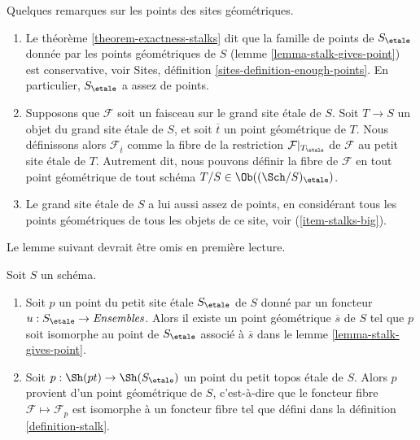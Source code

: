 \begin{remarks}
\label{remarks-enough-points}
Quelques remarques sur les points des sites g\'eom\'etriques.
\begin{enumerate}
\item Le th\'eor\`eme \ref{theorem-exactness-stalks} dit que la famille de points
de $S_\etale$ donn\'ee par les points g\'eom\'etriques de $S$
(lemme \ref{lemma-stalk-gives-point}) est conservative, voir
Sites, définition \ref{sites-definition-enough-points}.
En particulier, $S_\etale$ a assez de points.
\item Supposons que $\mathcal{F}$ soit un faisceau sur le grand site \'etale
\label{item-stalks-big}
de $S$. Soit $T \to S$ un objet du grand site \'etale de $S$,
et soit $\overline{t}$ un point g\'eom\'etrique de $T$. Nous d\'efinissons alors
$\mathcal{F}_{\overline{t}}$ comme la fibre
de la restriction $\mathcal{F}|_{T_\etale}$ de $\mathcal{F}$
au petit site \'etale de $T$. Autrement dit, nous pouvons d\'efinir
la fibre de $\mathcal{F}$ en tout point g\'eom\'etrique de tout
sch\'ema $T/S \in \Ob((\Sch/S)_\etale)$.
\item Le grand site \'etale de $S$ a lui aussi assez de points, en
consid\'erant tous les points g\'eom\'etriques de tous les objets de ce site, voir
(\ref{item-stalks-big}).
\end{enumerate}
\end{remarks}

\noindent
Le lemme suivant devrait \^etre omis en premi\`ere lecture.

\begin{lemma}
\label{lemma-points-small-etale-site}
Soit $S$ un sch\'ema.
\begin{enumerate}
\item Soit $p$ un point du petit site \'etale
$S_\etale$ de $S$ donn\'e par un foncteur
$u : S_\etale \to \textit{Ensembles}$.
Alors il existe un point g\'eom\'etrique $\overline{s}$ de $S$ tel que
$p$ soit isomorphe au point de $S_\etale$ associ\'e \`a
$\overline{s}$ dans le
lemme \ref{lemma-stalk-gives-point}.
\item Soit $p : \Sh(pt) \to \Sh(S_\etale)$ un point
du petit topos \'etale de $S$. Alors $p$ provient d'un point g\'eom\'etrique
de $S$, c'est-\`a-dire que le foncteur fibre $\mathcal{F} \mapsto \mathcal{F}_p$
est isomorphe \`a un foncteur fibre tel que d\'efini dans la
d\'efinition \ref{definition-stalk}.
\end{enumerate}
\end{lemma}

